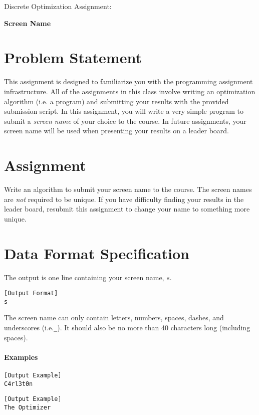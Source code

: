 \documentclass[11pt]{article}
\begin{document}
\huge
\noindent
{Discrete Optimization Assignment:}
\vspace{0.25cm}

\noindent
{\bf Screen Name}
\normalsize


\section{Problem Statement}
This assignment is designed to familiarize you with the programming assignment infrastructure.  All of the assignments in this class involve writing an optimization algorithm (i.e. a program) and submitting your results with the provided submission script.  In this assignment, you will write a very simple program to submit a {\em screen name} of your choice to the course.  In future assignments, your screen name will be used when presenting your results on a leader board.

\section{Assignment}

Write an algorithm to submit your screen name to the course.  The screen names are {\it not} required to be unique.  If you have difficulty finding your results in the leader board, resubmit this assignment to change your name to something more unique.

\section{Data Format Specification}

The output is one line containing your screen name, $s$.
%
\begin{verbatim}[Output Format]
s
\end{verbatim}
%
The screen name can only contain letters, numbers, spaces, dashes, and underscores (i.e.\texttt{\_}).  It should also be no more than 40 characters long (including spaces).

\paragraph{Examples}

\begin{verbatim}[Output Example]
C4rl3t0n
\end{verbatim}

\begin{verbatim}[Output Example]
The Optimizer
\end{verbatim}
\end{document}
